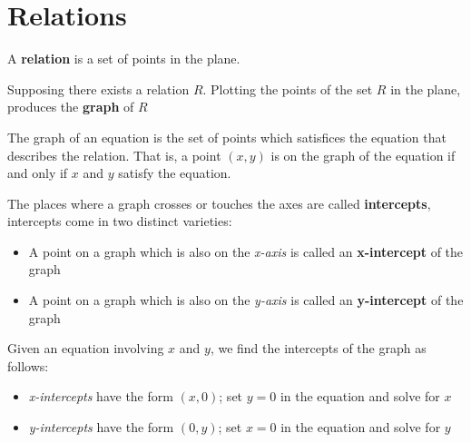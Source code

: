 \section{Relations}

\begin{definition}[Relation]
    A \textbf{relation} is a set of points in the plane.
\end{definition}

\begin{definition}
    Supposing there exists a relation $R$. Plotting the points of the set $R$ in the plane, produces the \textbf{graph} of $R$
\end{definition}

\begin{definition}
    The graph of an equation is the set of points which satisfices the equation that describes the relation. That is, a point $(x,y)$ is on the graph of the equation if and only if $x$ and $y$ satisfy the equation.
\end{definition}

\begin{definition}[Intercepts]
    The places where a graph crosses or touches the axes are called \textbf{intercepts}, intercepts come in two distinct varieties:
    \begin{itemize}
        \item A point on a graph which is also on the \textit{x-axis} is called an \textbf{x-intercept} of the graph
        \item A point on a graph which is also on the \textit{y-axis} is called an \textbf{y-intercept} of the graph
    \end{itemize}
\end{definition}

\begin{definition}
    Given an equation involving $x$ and $y$, we find the intercepts of the graph as follows:
    \begin{itemize}
        \item \textit{x-intercepts} have the form $(x,0)$; set $y=0$ in the equation and solve for $x$
        \item \textit{y-intercepts} have the form $(0,y)$; set $x=0$ in the equation and solve for $y$
    \end{itemize}
\end{definition}

